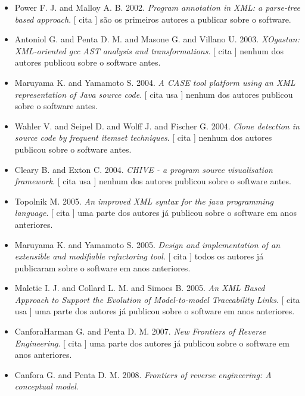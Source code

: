 \begin{itemize}
\item Power F. J. and Malloy A. B.
      2002.
        \textit{ Program annotation in XML: a parse-tree based approach}.
      [
          cita
      ]
são os primeiros autores a publicar sobre o software.
\item Antoniol G. and Penta D. M. and Masone G. and Villano U.
      2003.
        \textit{ XOgastan: XML-oriented gcc AST analysis and transformations}.
      [
          cita
      ]
nenhum dos autores publicou sobre o software antes.
\item Maruyama K. and Yamamoto S.
      2004.
        \textit{ A CASE tool platform using an XML representation of Java source code}.
      [
          cita
          usa
      ]
nenhum dos autores publicou sobre o software antes.
\item Wahler V. and Seipel D. and Wolff J. and Fischer G.
      2004.
        \textit{ Clone detection in source code by frequent itemset techniques}.
      [
          cita
      ]
nenhum dos autores publicou sobre o software antes.
\item Cleary B. and Exton C.
      2004.
        \textit{ CHIVE - a program source visualisation framework}.
      [
          cita
          usa
      ]
nenhum dos autores publicou sobre o software antes.
\item Topolnik M.
      2005.
        \textit{ An improved XML syntax for the java programming language}.
      [
          cita
      ]
uma parte dos autores já publicou sobre o software em anos anteriores.
\item Maruyama K. and Yamamoto S.
      2005.
        \textit{ Design and implementation of an extensible and modifiable refactoring tool}.
      [
          cita
      ]
todos os autores já publicaram sobre o software em anos anteriores.
\item Maletic I. J. and Collard L. M. and Simoes B.
      2005.
        \textit{ An XML Based Approach to Support the Evolution of Model-to-model Traceability Links}.
      [
          cita
          usa
      ]
uma parte dos autores já publicou sobre o software em anos anteriores.
\item CanforaHarman G. and Penta D. M.
      2007.
        \textit{ New Frontiers of Reverse Engineering}.
      [
          cita
      ]
uma parte dos autores já publicou sobre o software em anos anteriores.
\item Canfora G. and Penta D. M.
      2008.
        \textit{ Frontiers of reverse engineering: A conceptual model}.

\end{itemize}
